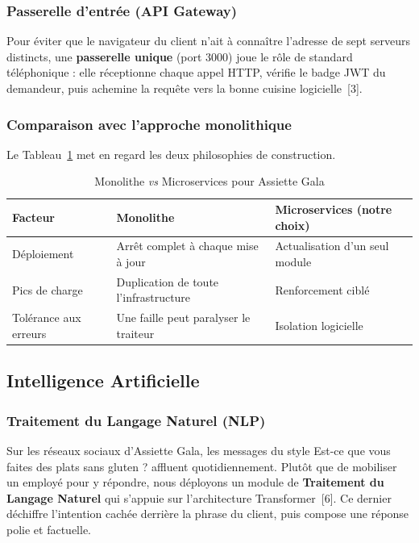 \subsubsection{Passerelle d'entrée (API Gateway)}

Pour éviter que le navigateur du client n'ait à connaître l'adresse de sept serveurs distincts, une \textbf{passerelle unique} (port 3000) joue le rôle de standard téléphonique : elle réceptionne chaque appel HTTP, vérifie le badge JWT du demandeur, puis achemine la requête vers la bonne cuisine logicielle~[3].

\subsubsection{Comparaison avec l'approche monolithique}

Le Tableau~\ref{tab:mono_vs_micro} met en regard les deux philosophies de construction.

\begin{table}[H]
    \centering
    \caption{Monolithe \textit{vs} Microservices pour Assiette Gala}
    \label{tab:mono_vs_micro}
    \begin{tabular}{|p{4cm}|p{4.5cm}|p{4.5cm}|}
        \hline
        \textbf{Facteur} & \textbf{Monolithe} & \textbf{Microservices (notre choix)} \\
        \hline
        Déploiement & Arrêt complet à chaque mise à jour & Actualisation d'un seul module \\
        \hline
        Pics de charge & Duplication de toute l'infrastructure & Renforcement ciblé \\
        \hline
        Tolérance aux erreurs & Une faille peut paralyser le traiteur & Isolation logicielle \\
        \hline
    \end{tabular}
\end{table}

\subsection{Intelligence Artificielle}

\subsubsection{Traitement du Langage Naturel (NLP)}

Sur les réseaux sociaux d'Assiette Gala, les messages du style \og Est-ce que vous faites des plats sans gluten ? \fg{} affluent quotidiennement. Plutôt que de mobiliser un employé pour y répondre, nous déployons un module de \textbf{Traitement du Langage Naturel} qui s'appuie sur l'architecture Transformer~[6]. Ce dernier déchiffre l'intention cachée derrière la phrase du client, puis compose une réponse polie et factuelle.

